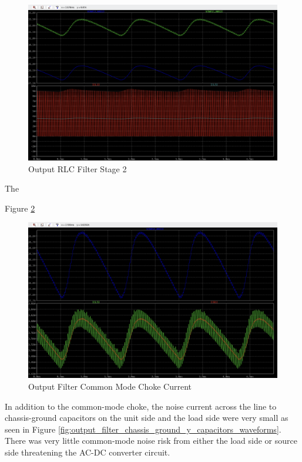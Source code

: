 \documentclass[conference]{IEEEtran}
\begin{document}
\begin{figure}[htp]
    \centering
    \includegraphics[width=1.0\linewidth]{output_filter_rlc_stage_2.png}
    \caption{Output RLC Filter Stage 2}
    \label{fig:output_filter_rlc_stage_2_waveforms}
\end{figure}

The 

Figure \ref{fig:output_filter_common_mode_choke_waveforms}

\begin{figure}[htp]
    \centering
    \includegraphics[width=1.0\linewidth]{output_filter_common_mode_choke.png}
    \caption{Output Filter Common Mode Choke Current}
    \label{fig:output_filter_common_mode_choke_waveforms}
\end{figure}

In addition to the common-mode choke, the noise current across the line to chassis-ground capacitors on the unit side and the load side were very small as seen in Figure \ref{fig:output_filter_chassis_ground_y_capacitors_waveforms}. There was very little common-mode noise risk from either the load side or source side threatening the AC-DC converter circuit.  
\end{document}
